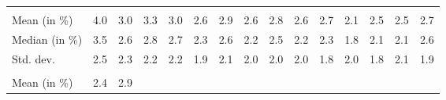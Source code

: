 \begin{tabular}{lllllllllllllll}
  \multicolumn{1}{|r}{} &
  \multicolumn{1}{r}{} &
  \multicolumn{1}{r}{} &
  \multicolumn{1}{r}{} &
  \multicolumn{1}{r}{} &
  \multicolumn{1}{r}{} &
  \multicolumn{1}{r}{} &
  \multicolumn{1}{r}{} &
  \multicolumn{1}{r}{} &
  \multicolumn{1}{r}{} &
  \multicolumn{1}{r}{} &
  \multicolumn{1}{r}{} &
  \multicolumn{1}{r}{} &
  \multicolumn{1}{r}{} \\
\multicolumn{1}{l}{\hspace{2em}Mean (in $\%$)} &
  \multicolumn{1}{|r}{4.0} &
  \multicolumn{1}{r}{3.0} &
  \multicolumn{1}{r}{3.3} &
  \multicolumn{1}{r}{3.0} &
  \multicolumn{1}{r}{2.6} &
  \multicolumn{1}{r}{2.9} &
  \multicolumn{1}{r}{2.6} &
  \multicolumn{1}{r}{2.8} &
  \multicolumn{1}{r}{2.6} &
  \multicolumn{1}{r}{2.7} &
  \multicolumn{1}{r}{2.1} &
  \multicolumn{1}{r}{2.5} &
  \multicolumn{1}{r}{2.5} &
  \multicolumn{1}{r}{2.7} \\
\multicolumn{1}{l}{\hspace{2em}Median (in $\%$)} &
  \multicolumn{1}{|r}{3.5} &
  \multicolumn{1}{r}{2.6} &
  \multicolumn{1}{r}{2.8} &
  \multicolumn{1}{r}{2.7} &
  \multicolumn{1}{r}{2.3} &
  \multicolumn{1}{r}{2.6} &
  \multicolumn{1}{r}{2.2} &
  \multicolumn{1}{r}{2.5} &
  \multicolumn{1}{r}{2.2} &
  \multicolumn{1}{r}{2.3} &
  \multicolumn{1}{r}{1.8} &
  \multicolumn{1}{r}{2.1} &
  \multicolumn{1}{r}{2.1} &
  \multicolumn{1}{r}{2.6} \\
\multicolumn{1}{l}{\hspace{2em}Std. dev.} &
  \multicolumn{1}{|r}{2.5} &
  \multicolumn{1}{r}{2.3} &
  \multicolumn{1}{r}{2.2} &
  \multicolumn{1}{r}{2.2} &
  \multicolumn{1}{r}{1.9} &
  \multicolumn{1}{r}{2.1} &
  \multicolumn{1}{r}{2.0} &
  \multicolumn{1}{r}{2.0} &
  \multicolumn{1}{r}{2.0} &
  \multicolumn{1}{r}{1.8} &
  \multicolumn{1}{r}{2.0} &
  \multicolumn{1}{r}{1.8} &
  \multicolumn{1}{r}{2.1} &
  \multicolumn{1}{r}{1.9} \\
\multicolumn{1}{l}{\hspace{1em}{\textit{Additive term} ($\widehat{t}/\widetilde{p}$)}} &
  \multicolumn{1}{|r}{} &
  \multicolumn{1}{r}{} &
  \multicolumn{1}{r}{} &
  \multicolumn{1}{r}{} &
  \multicolumn{1}{r}{} &
  \multicolumn{1}{r}{} &
  \multicolumn{1}{r}{} &
  \multicolumn{1}{r}{} &
  \multicolumn{1}{r}{} &
  \multicolumn{1}{r}{} &
  \multicolumn{1}{r}{} &
  \multicolumn{1}{r}{} &
  \multicolumn{1}{r}{} &
  \multicolumn{1}{r}{} \\
\multicolumn{1}{l}{\hspace{2em}Mean (in $\%$)} &
  \multicolumn{1}{|r}{2.4} &
  \multicolumn{1}{r}{2.9} &

\end{tabular}
